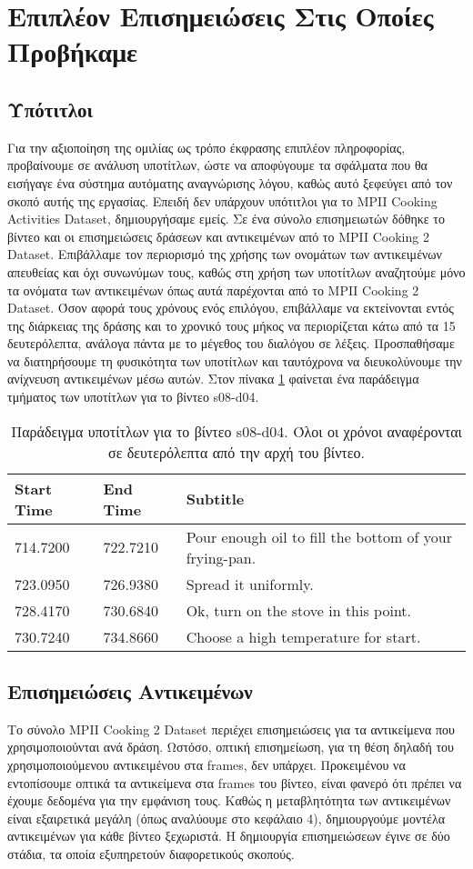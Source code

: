 \section{Επιπλέον Επισημειώσεις Στις Οποίες Προβήκαμε}
\subsection{Υπότιτλοι}
Για την αξιοποίηση της ομιλίας ως τρόπο έκφρασης επιπλέον πληροφορίας, προβαίνουμε σε ανάλυση υποτίτλων, ώστε να αποφύγουμε τα σφάλματα που θα εισήγαγε ένα σύστημα αυτόματης αναγνώρισης λόγου, καθώς αυτό ξεφεύγει από τον σκοπό αυτής της εργασίας. Επειδή δεν υπάρχουν υπότιτλοι για το MPII Cooking Activities Dataset, δημιουργήσαμε εμείς. Σε ένα σύνολο επισημειωτών δόθηκε το βίντεο και οι επισημειώσεις δράσεων και αντικειμένων από το MPII Cooking 2 Dataset. Επιβάλλαμε τον περιορισμό της χρήσης των ονομάτων των αντικειμένων απευθείας και όχι συνωνύμων τους, καθώς στη χρήση των υποτίτλων αναζητούμε μόνο τα ονόματα των αντικειμένων όπως αυτά παρέχονται από το MPII Cooking 2 Dataset. Όσον αφορά τους χρόνους ενός επιλόγου, επιβάλλαμε να εκτείνονται εντός της διάρκειας της δράσης και το χρονικό τους μήκος να περιορίζεται κάτω από τα 15 δευτερόλεπτα, ανάλογα πάντα με το μέγεθος του διαλόγου σε λέξεις. Προσπαθήσαμε να διατηρήσουμε τη φυσικότητα των υποτίτλων και ταυτόχρονα να διευκολύνουμε την ανίχνευση αντικειμένων μέσω αυτών. Στον πίνακα \ref{tab:DataSubtitles} φαίνεται ένα παράδειγμα τμήματος των υποτίτλων για το βίντεο s08-d04.

\begin{table}
    \begin{tabular}{ | l | l | l |}
    \hline
    Start Time & End Time & Subtitle \\ \hline
    714.7200 & 722.7210 & Pour enough oil to fill the bottom of your frying-pan. \\ \hline
	723.0950 & 726.9380 & Spread it uniformly. \\ \hline
	728.4170 & 730.6840 & Ok, turn on the stove in this point. \\ \hline
	730.7240 & 734.8660 & Choose a high temperature for start. \\
    \hline
    \end{tabular}
	\caption{Παράδειγμα υποτίτλων για το βίντεο s08-d04. Όλοι οι χρόνοι αναφέρονται σε δευτερόλεπτα από την αρχή του βίντεο.}
	\label{tab:DataSubtitles}
\end{table}


\subsection{Επισημειώσεις Αντικειμένων}
Το σύνολο MPII Cooking 2 Dataset περιέχει επισημειώσεις για τα αντικείμενα που χρησιμοποιούνται ανά δράση. Ωστόσο, οπτική επισημείωση, για τη θέση δηλαδή του χρησιμοποιούμενου αντικειμένου στα frames, δεν υπάρχει. Προκειμένου να εντοπίσουμε οπτικά τα αντικείμενα στα frames του βίντεο, είναι φανερό ότι πρέπει να έχουμε δεδομένα για την εμφάνιση τους. Καθώς η μεταβλητότητα των αντικειμένων είναι εξαιρετικά μεγάλη (όπως αναλύουμε στο κεφάλαιο 4), δημιουργούμε μοντέλα αντικειμένων για κάθε βίντεο ξεχωριστά. Η δημιουργία επισημειώσεων έγινε σε δύο στάδια, τα οποία εξυπηρετούν διαφορετικούς σκοπούς.

